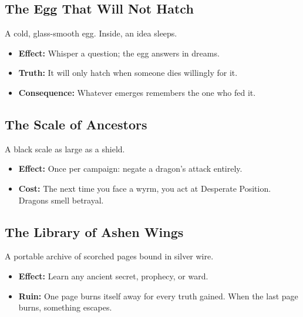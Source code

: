 \documentclass[11pt,letterpaper]{article}
\newcommand{\subsectionheader}[1]{\subsection*{#1}}
\begin{document}
\subsectionheader{The Egg That Will Not Hatch}
A cold, glass-smooth egg. Inside, an idea sleeps.
\begin{itemize}[leftmargin=*]
\item \textbf{Effect:} Whisper a question; the egg answers in dreams.
\item \textbf{Truth:} It will only hatch when someone dies willingly for it.
\item \textbf{Consequence:} Whatever emerges remembers the one who fed it.
\end{itemize}

\subsectionheader{The Scale of Ancestors}
A black scale as large as a shield.
\begin{itemize}[leftmargin=*]
\item \textbf{Effect:} Once per campaign: negate a dragon's attack entirely.
\item \textbf{Cost:} The next time you face a wyrm, you act at Desperate Position.  
Dragons smell betrayal.
\end{itemize}

\subsectionheader{The Library of Ashen Wings}
A portable archive of scorched pages bound in silver wire.
\begin{itemize}[leftmargin=*]
\item \textbf{Effect:} Learn any ancient secret, prophecy, or ward.
\item \textbf{Ruin:} One page burns itself away for every truth gained.  
When the last page burns, something escapes.
\end{itemize}
\end{document}
